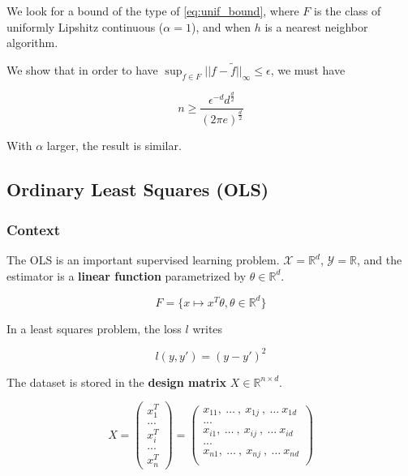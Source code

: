 \documentclass[
10pt, %
a4paper, %
oneside, %
headinclude,footinclude, %
BCOR5mm, %
]{scrartcl}
\begin{document}
    We look for a bound of the type of \ref{eq:unif_bound}, where $F$ is the class of uniformly Lipshitz continuous ($\alpha=1$), and when  $h$ is a nearest neighbor algorithm.

    We show that in order to have $ \sup_{f\in F}||f- \tilde{f}||_{\infty}\leq \epsilon$, we must have

    \begin{equation*}
	n\geq \frac{\epsilon^{-d}d^{ \frac{d}{2} }}{(2\pi e)^{ \frac{d}{2} } }
    \end{equation*}

    \begin{remark}
        With $\alpha$ larger, the result is similar.
    \end{remark}


\subsection{\large\color{MidnightBlue}Ordinary Least Squares (OLS)}
\label{subsec:ols}

\subsubsection{\large\color{Periwinkle}Context}
\label{con:ols}

The OLS is an important supervised learning problem. $ \mathcal{X} = \mathbb{R}^d$, $ \mathcal{Y}  = \mathbb{R} $, and the estimator is a \textbf{{linear function}} parametrized by $ \theta\in \mathbb{R}^d$.

\begin{equation*}
    F = \{ x\mapsto x^T \theta, \theta \in \mathbb{R}^d\}
\end{equation*}

In a least squares problem, the loss $l$ writes 

\begin{equation*}
    l(y,y') = (y-y')^2
\end{equation*}

The dataset is stored in the \textbf{{design matrix}} $X\in \mathbb{R}^{n\times d}$.

\begin{equation*}
X=
\begin{pmatrix}
x_{1}^T\\
...\\
x_{i}^T\\
...\\
x_{n}^T
\end{pmatrix}
=
\begin{pmatrix}
    x_{11}, \:\dots\:,\: x_{1j}\:, \:\dots\: x_{1d}\\
...\\
    x_{i1}, \:\dots\:,\: x_{ij}\:, \:\dots\: x_{id}\\
...\\
    x_{n1}, \:\dots\:,\: x_{nj}\:, \:\dots\: x_{nd}\\
\end{pmatrix}
\end{equation*}
\end{document}
